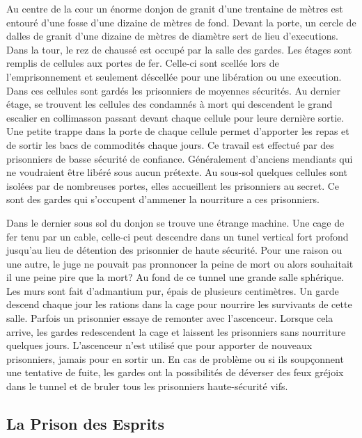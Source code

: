 Au centre de la cour un énorme donjon de granit d'une trentaine de
mètres est entouré d'une fosse
d'une dizaine de mètres de fond. Devant la porte, un 
cercle de dalles de granit d'une dizaine de mètres de diamètre sert de lieu 
d'executions. Dans la tour,
le rez de chaussé est occupé par la salle des gardes. Les étages sont 
remplis de cellules aux portes de fer. Celle-ci sont scellée lors de 
l'emprisonnement et seulement déscellée pour une libération ou une 
execution. Dans ces cellules sont gardés les prisonniers de moyennes 
sécurités. Au dernier étage, se trouvent les cellules des 
condamnés à mort qui descendent le grand escalier en collimasson passant
devant chaque cellule pour leure dernière sortie. Une petite trappe dans 
la porte de chaque cellule permet d'apporter 
les repas et de sortir les bacs de commodités chaque jours. Ce travail est effectué par 
des prisonniers de basse sécurité de confiance. Généralement d'anciens 
mendiants qui ne voudraient être libéré sous aucun prétexte. Au sous-sol quelques cellules sont 
isolées par de nombreuses portes, elles accueillent les prisonniers 
au secret. Ce sont des gardes qui s'occupent d'ammener la nourriture a ces 
prisonniers.

Dans le dernier sous sol du donjon se trouve une étrange machine. Une cage de fer tenu 
par un cable, celle-ci peut descendre dans un tunel vertical fort profond
jusqu'au lieu de détention des prisonnier de haute sécurité. Pour une 
raison ou une autre, le juge ne pouvait pas pronnoncer la peine de mort
ou alors souhaitait il une peine pire que la mort? Au fond de ce tunnel une grande
salle sphérique. Les murs sont fait d'admantium pur, épais de plusieurs 
centimètres. Un garde descend chaque jour les rations dans la cage pour nourrire les 
survivants de cette salle. Parfois un prisonnier 
essaye de remonter avec l'ascenceur. Lorsque cela arrive, les gardes redescendent la cage et 
laissent les prisonniers sans nourriture quelques jours. L'ascenceur n'est utilisé
que pour apporter de nouveaux prisonniers, jamais pour en sortir un. En cas de
problème ou si ils soupçonnent une tentative de fuite, les gardes ont la possibilités 
de déverser des feux gréjoix dans le tunnel et de bruler tous les prisonniers 
haute-sécurité vifs.

\subsection{La Prison des Esprits}

